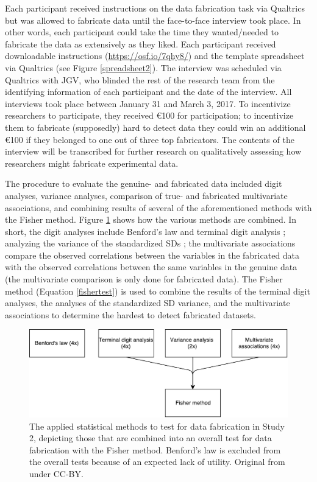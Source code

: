 \documentclass{article}
\begin{document}
Each participant received instructions on the data fabrication task via Qualtrics but was allowed to fabricate data until the face-to-face interview took place. In other words, each participant could take the time they wanted/needed to fabricate the data as extensively as they liked. Each participant received downloadable instructions (\url{https://osf.io/7qhy8/}) and the template spreadsheet via Qualtrics (see Figure \ref{spreadsheet2}). The interview was scheduled via Qualtrics with JGV, who blinded the rest of the research team from the identifying information of each participant and the date of the interview. All interviews took place between January 31 and March 3, 2017. To incentivize researchers to participate, they received \euro 100 for participation; to incentivize them to fabricate (supposedly) hard to detect data they could win an additional \euro 100 if they belonged to one out of three top fabricators. The contents of the interview will be transcribed for further research on qualitatively assessing how researchers might fabricate experimental data.

The procedure to evaluate the genuine- and fabricated data included digit analyses, variance analyses, comparison of true- and fabricated multivariate associations, and combining results of several of the aforementioned methods with the Fisher method. Figure \ref{study2proc} shows how the various methods are combined. In short, the digit analyses include Benford's law \citep{Benford1938-fl} and terminal digit analysis \citep{Mosimann1995-av,Mosimann2002-oj}; analyzing the variance of the standardized SDs \citep[similar to Study 1;][]{simonsohn2013}; the multivariate associations compare the observed correlations between the variables in the fabricated data with the observed correlations between the same variables in the genuine data (the multivariate comparison is only done for fabricated data). The Fisher method (Equation \ref{fishertest}) is used to combine the results of the terminal digit analyses, the analyses of the standardized SD variance, and the multivariate associations to determine the hardest to detect fabricated datasets. 

\begin{figure}
\begin{center}
\includegraphics[width=\textwidth,height=\textheight,keepaspectratio]{../figures/study2proc.pdf}
\caption{The applied statistical methods to test for data fabrication in Study 2, depicting those that are combined into an overall test for data fabrication with the Fisher method. Benford’s law is excluded from the overall tests because of an expected lack of utility. Original from \citet{10.3897/rio.2.e8860} under CC-BY.}
\label{study2proc}
\end{center}
\end{figure}
\end{document}
